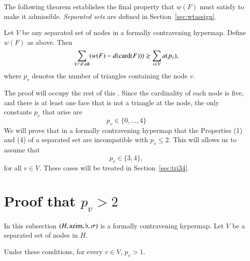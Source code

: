 The following theorem establishes the final property that $w(F)$
must satisfy to make it admissible.  {\it Separated sets\/} are
defined in Section~\ref{sec:wtassign}.

\begin{theorem}
        \label{proposition:excess}
        Let $V$ be any separated set of nodes in a formally contravening hypermap.
        Define $w(F)$ as above.
        Then
        $$\sum_{V\cap F\ne\emptyset} (w(F) -d({\operatorname{card}}(F)))
            \ge \sum_{v\in V} a(p_v),$$
        where $p_v$ denotes the number of triangles containing
        the node $v$.
\end{theorem}

The proof will occupy the rest of this \chap. Since the cardinality
of each node is five, and there is at least one face that is not a
triangle at the node, the only constants $p_v$ that arise are
    $$p_v \in\{0,\ldots,4\}$$
We will prove that in a formally contravening hypermap that the
Properties (1) and (4) of a separated set are incompatible with
$p_v\le 2$.  This will allows us to assume that
$$p_v\in\{3,4\},$$ for all $v\in V$.  These cases will be treated in
Section~\ref{sec:tri34}.

\section{Proof that $p_v>2$}
\label{sec:2.4} \label{sec:tri2}

In this subsection $(H,{\operatorname{azim}},\flat,\sigma)$ is a formally
contravening hypermap.  Let $V$ be a separated set of nodes in $H$.

\begin{lemma}  Under these conditions, for every $v\in V$,
$p_v>1$.
\end{lemma}

